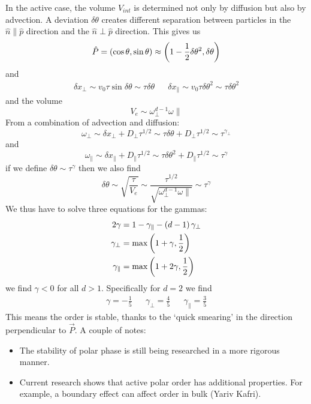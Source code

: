 In the active case, the volume \(V_{int}\) is determined not only by diffusion but also by advection. A deviation \(\delta\theta \) creates different separation between particles in the \(\hat n \parallel \hat p\) direction and the \(\hat n \perp \hat p\) direction. This gives us
\begin{equation}
    \hat P = \left(\cos\theta,\sin\theta\right) \approx \left(1-\frac{1}{2}\delta\theta^2,\delta\theta\right)
\end{equation}
and
\begin{align}
    \delta x_\perp \sim v_0\tau\sin\delta\theta \sim \tau\delta\theta && \delta x_\parallel \sim v_0\tau\delta\theta^2 \sim \tau\delta\theta^2
\end{align}
and the volume
\begin{equation}
    V_e \sim \omega_\perp^{d-1}\omega\parallel
\end{equation}
From a combination of advection and diffusion:
\begin{equation}
    \omega_\perp \sim \delta x_\perp + D_\perp\tau^{1/2} \sim \tau\delta\theta + D_\perp\tau^{1/2} \sim \tau^{\gamma_\perp}
\end{equation}
and
\begin{equation}
    \omega_\parallel \sim \delta x_\parallel + D_\parallel\tau^{1/2} \sim \tau\delta\theta^2+D_\parallel\tau^{1/2}\sim\tau^\gamma
\end{equation}
if we define \(\delta\theta\sim\tau^\gamma \) then we also find
\begin{equation}
    \delta\theta \sim \sqrt{\frac{\tau}{V_e}} \sim \frac{\tau^{1/2}}{\sqrt{\omega_\perp^{d-1}\omega\parallel}}\sim\tau^\gamma
\end{equation}
We thus have to solve three equations for the gammas:
\begin{align}
    2\gamma &= 1-\gamma_\parallel-\left(d-1\right)\gamma_\perp \\
    \gamma_\perp &= \max\left(1+\gamma,\frac{1}{2}\right) \\
    \gamma_\parallel &= \max\left(1+2\gamma,\frac{1}{2}\right)
\end{align}
we find \(\gamma < 0\) for all \(d>1\). Specifically for \(d=2\) we find
\begin{align}
    \gamma = -\frac{1}{5} && \gamma_\perp = \frac{4}{5} && \gamma_\parallel = \frac{3}{5}
\end{align}
This means the order is stable, thanks to the `quick smearing' in the direction perpendicular to \(\vec{P}\). A couple of notes:
\begin{itemize}
    \item The stability of polar phase is still being researched in a more rigorous manner.
    \item Current research shows that active polar order has additional properties. For example, a boundary effect can affect order in bulk (Yariv Kafri).
\end{itemize}
